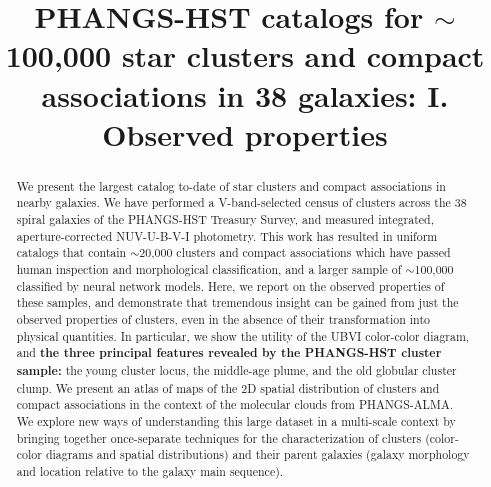 \documentclass[linenumbers]{aastex63}
\begin{document}
\title{PHANGS-HST catalogs for $\sim$100,000 star clusters and compact associations in 38 galaxies: I. Observed properties}




\begin{abstract}
We present the largest catalog to-date of star clusters and compact associations in nearby galaxies.  We have performed a V-band-selected census of clusters across the 38 spiral galaxies of the PHANGS-HST Treasury Survey, and measured integrated, aperture-corrected NUV-U-B-V-I photometry.
This work has resulted in uniform catalogs that contain $\sim$20,000 clusters and compact associations which have passed human inspection and morphological classification, and a larger sample of $\sim$100,000 classified by neural network models. 
Here, we report on the observed properties of these samples, and demonstrate that tremendous insight can be gained from just the observed properties of clusters, even in the absence of their transformation into physical quantities. 
In particular, we show the utility of the UBVI color-color diagram, and \textbf{the three principal features revealed by the PHANGS-HST cluster sample:} the young cluster locus, the middle-age plume, and the old globular cluster clump.  
We present an atlas of maps of the 2D spatial distribution of clusters and compact associations in the context of the molecular clouds from PHANGS-ALMA.  We explore new ways of understanding this large dataset in a multi-scale context by bringing together once-separate techniques for the characterization of clusters (color-color diagrams and spatial distributions) and their parent galaxies (galaxy morphology and location relative to the galaxy main sequence). 

\end{abstract}
\end{document}
